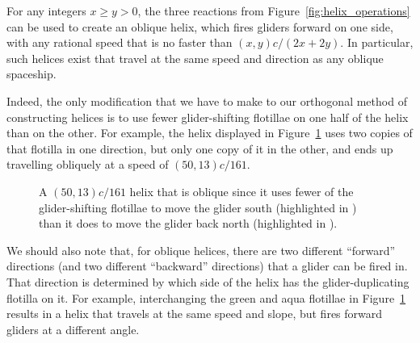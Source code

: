 \begin{theorem}\label{thm:universality_oblique_helices}
	For any integers $x \geq y > 0$, the three reactions from Figure~\ref{fig:helix_operations} can be used to create an oblique helix, which fires gliders forward on one side, with any rational speed that is no faster than $(x,y)c/(2x + 2y)$. In particular, such helices exist that travel at the same speed and direction as any oblique spaceship.
\end{theorem}

Indeed, the only modification that we have to make to our orthogonal method of constructing helices is to use fewer glider-shifting flotillae on one half of the helix than on the other. For example, the helix displayed in Figure~\ref{fig:50_13c_161_helix} uses two copies of that flotilla in one direction, but only one copy of it in the other, and ends up travelling obliquely at a speed of $(50,13)c/161$.

\begin{figure}[!htb]
	\centering
	\caption{A $(50,13)c/161$ helix that is oblique since it uses fewer of the glider-shifting flotillae to move the glider south (highlighted in ) than it does to move the glider back north (highlighted in ).}\label{fig:50_13c_161_helix}
\end{figure}

We should also note that, for oblique helices, there are two different ``forward'' directions (and two different ``backward'' directions) that a glider can be fired in. That direction is determined by which side of the helix has the glider-duplicating flotilla on it. For example, interchanging the green and aqua flotillae in Figure~\ref{fig:50_13c_161_helix} results in a helix that travels at the same speed and slope, but fires forward gliders at a different angle.

